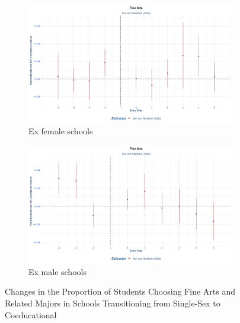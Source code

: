 \begin{figure}[H]
    \centering
    \begin{subfigure}[b]{0.45\textwidth}
        \centering
        \includegraphics[width=\textwidth]{Graph/Results/stagered_ex_females_FINE_ARTS.png}
        \caption{Ex female schools }
        \label{fig:staggered_females_fine_arts}
    \end{subfigure}
    \hfill
    \begin{subfigure}[b]{0.45\textwidth}
        \centering
        \includegraphics[width=\textwidth]{Graph/Results/stagered_ex_Males_FINE_ARTS.png}
        \caption{Ex male schools }
        \label{fig:staggered_males_fine_arts}
    \end{subfigure}
\caption{ Changes in the Proportion of Students Choosing Fine Arts and Related Majors in Schools Transitioning from Single-Sex to Coeducational}
    \label{fig:staggered_fine_arts}
\end{figure}

